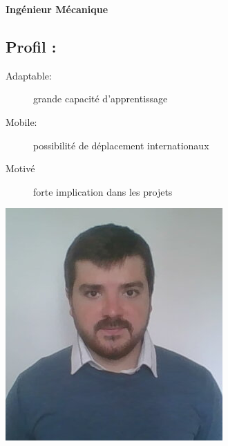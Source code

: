 \documentclass[10pt,a4paper,sans]{article}
\begin{document}

\begin{minipage}{0.36\textwidth}
    
\end{minipage}
\begin{minipage}{0.63\textwidth}
    \begin{mdframed}[style=titre1]
        \begin{flushright}
            \Large{\textbf{Ingénieur Mécanique}}
        \end{flushright}
    \end{mdframed}
    \begin{minipage}{0.75\textwidth}
        \subsection{Profil :}
        \begin{description}
            \item[Adaptable:]grande capacité d'apprentissage
            \item[Mobile:]possibilité de déplacement internationaux
            \item[Motivé]forte implication dans les projets
        \end{description}
    \end{minipage}
    \begin{minipage}{0.23\textwidth}
        \includegraphics[width=\textwidth]{img/image_CV.png}
    \end{minipage}
\end{minipage}
\end{document}
